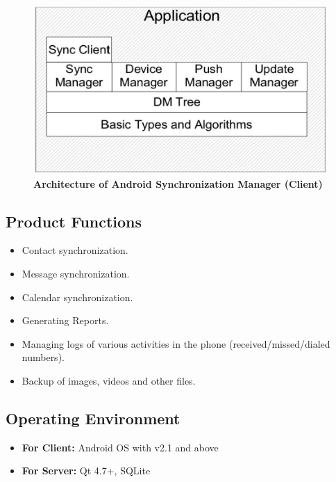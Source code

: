 \begin{figure}[H]
  \centering
    \includegraphics[scale=0.45]{project/images/client-architecture}
  \caption{\textbf{Architecture of Android Synchronization Manager (Client)}}
\end{figure}

\subsection{Product Functions}
\begin{itemize}
 \item Contact synchronization.
 \item Message synchronization.
 \item Calendar synchronization.
 \item Generating Reports.
 \item Managing logs of various activities in the phone (received/missed/dialed numbers).
 \item Backup of images, videos and other files.
\end{itemize}

\subsection{Operating Environment}
\begin{itemize}
 \item \textbf{For Client:} Android OS with v2.1 and above
 \item \textbf{For Server:} Qt 4.7+, SQLite
\end{itemize}

